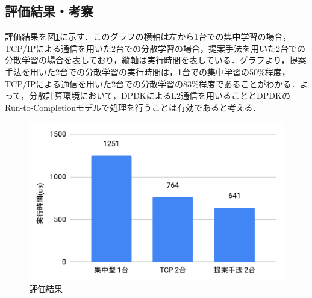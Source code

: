 \subsection{評価結果・考察}
評価結果を図\ref{fig:EvaluationResult}に示す．このグラフの横軸は左から1台での集中学習の場合，TCP/IPによる通信を用いた2台での分散学習の場合，提案手法を用いた2台での分散学習の場合を表しており，縦軸は実行時間を表している．グラフより，提案手法を用いた2台での分散学習の実行時間は，1台での集中学習の50\%程度，TCP/IPによる通信を用いた2台での分散学習の83\%程度であることがわかる．よって，分散計算環境において，DPDKによるL2通信を用いることとDPDKのRun-to-Completionモデルで処理を行うことは有効であると考える．

\begin{figure}[htb]
  \centering
  \includegraphics[width=\columnwidth]{pictures/EvaluationResult.pdf}
  \caption{評価結果}
  \label{fig:EvaluationResult}
\end{figure}
